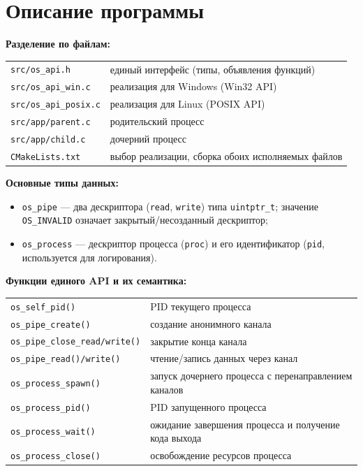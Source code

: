 \section{Описание программы}

\textbf{Разделение по файлам:}

\begin{center}
\begin{tabular}{ll}
\texttt{src/os\_api.h}       & единый интерфейс (типы, объявления функций) \\
\texttt{src/os\_api\_win.c}  & реализация для Windows (Win32 API) \\
\texttt{src/os\_api\_posix.c}& реализация для Linux (POSIX API) \\
\texttt{src/app/parent.c}     & родительский процесс \\
\texttt{src/app/child.c}      & дочерний процесс \\
\texttt{CMakeLists.txt}      & выбор реализации, сборка обоих исполняемых файлов \\
\end{tabular}
\end{center}

\textbf{Основные типы данных:}
\begin{itemize}
  \item \texttt{os\_pipe} --- два дескриптора (\texttt{read}, \texttt{write}) типа
    \texttt{uintptr\_t}; значение \texttt{OS\_INVALID} означает закрытый/несозданный дескриптор;
  \item \texttt{os\_process} --- дескриптор процесса (\texttt{proc}) и его идентификатор
    (\texttt{pid}, используется для логирования).
\end{itemize}

\textbf{Функции единого API и их семантика:}

\begin{center}
\begin{tabular}{ll}
\texttt{os\_self\_pid()}               & PID текущего процесса \\
\texttt{os\_pipe\_create()}           & создание анонимного канала \\
\texttt{os\_pipe\_close\_read/write()} & закрытие конца канала \\
\texttt{os\_pipe\_read()/write()}      & чтение/запись данных через канал \\
\texttt{os\_process\_spawn()}         & запуск дочернего процесса с перенаправлением каналов \\
\texttt{os\_process\_pid()}           & PID запущенного процесса \\
\texttt{os\_process\_wait()}          & ожидание завершения процесса и получение кода выхода \\
\texttt{os\_process\_close()}         & освобождение ресурсов процесса \\
\end{tabular}
\end{center}

